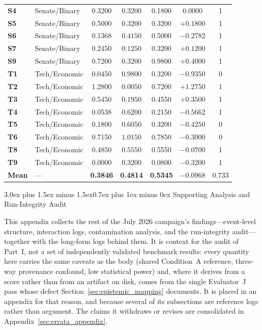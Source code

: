 \documentclass[11pt,journal,onecolumn]{IEEEtran}
\makeatletter
\renewcommand\section{\@startsection{section}{1}{\z@}%
  {3.0ex plus 1.5ex minus 1.5ex}{0.7ex plus 1ex minus 0ex}%
  {\normalfont\normalsize\centering\bfseries}}
\makeatother
\begin{document}
\begin{table}[!htbp]
\begin{tabular}{llccccc}
\textbf{S4} & Senate/Binary & 0.3200 & $0.3200$ & 0.1800 & $0.0000$ & 1 \\
\textbf{S5} & Senate/Binary & 0.5000 & $\mathbf{0.3200}$ & 0.3200 & $\mathbf{+0.1800}$ & 1 \\
\textbf{S6} & Senate/Binary & 0.1368 & $0.4150$ & 0.5000 & $-0.2782$ & 1 \\
\textbf{S7} & Senate/Binary & 0.2450 & $\mathbf{0.1250}$ & 0.3200 & $\mathbf{+0.1200}$ & 1 \\
\textbf{S9} & Senate/Binary & 0.7200 & $\mathbf{0.3200}$ & 0.9800 & $\mathbf{+0.4000}$ & 1 \\
\textbf{T1} & Tech/Economic & 0.0450 & $0.9800$ & 0.3200 & $-0.9350$ & 0 \\
\textbf{T2} & Tech/Economic & 1.2800 & $\mathbf{0.0050}$ & 0.7200 & $\mathbf{+1.2750}$ & 1 \\
\textbf{T3} & Tech/Economic & 0.5450 & $\mathbf{0.1950}$ & 0.4550 & $\mathbf{+0.3500}$ & 1 \\
\textbf{T4} & Tech/Economic & 0.0538 & $0.6200$ & 0.2150 & $-0.5662$ & 1 \\
\textbf{T5} & Tech/Economic & 0.1800 & $0.6050$ & 0.3200 & $-0.4250$ & 0 \\
\textbf{T6} & Tech/Economic & 0.7150 & $1.0150$ & 0.7850 & $-0.3000$ & 0 \\
\textbf{T8} & Tech/Economic & 0.4850 & $0.5550$ & 0.5550 & $-0.0700$ & 1 \\
\textbf{T9} & Tech/Economic & 0.0000 & $0.3200$ & 0.0800 & $-0.3200$ & 1 \\
\midrule
\textbf{Mean} & --- & \textbf{0.3846} & \textbf{0.4814} & \textbf{0.5345} & $-0.0968$ & 0.733 \\
\bottomrule
\end{tabular}
\setlength{\tabcolsep}{6pt}
\end{table}
\section{Supporting Analysis and Run-Integrity Audit}
\label{sec:full_campaign_supporting}

This appendix collects the rest of the July 2026 campaign's findings---event-level structure, interaction logs, contamination analysis, and the run-integrity audit---together with the long-form logs behind them. It is context for the audit of Part~I, not a set of independently validated benchmark results: every quantity here carries the same caveats as the body (shared Condition~A reference, three-way provenance confound, low statistical power) and, where it derives from a score rather than from an artifact on disk, comes from the single Evaluator~J pass whose defect Section~\ref{sec:epistemic_mapping} documents. It is placed in an appendix for that reason, and because several of its subsections are reference logs rather than argument. The claims it withdraws or revises are consolidated in Appendix~\ref{sec:errata_appendix}.
\end{document}
